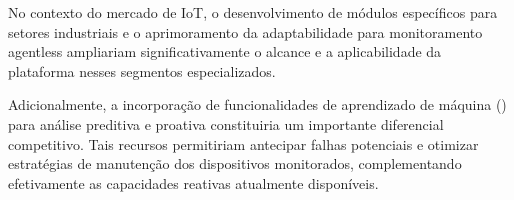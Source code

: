 No contexto do mercado de IoT, o desenvolvimento de módulos específicos para setores industriais e o aprimoramento da adaptabilidade para monitoramento agentless ampliariam significativamente o alcance e a aplicabilidade da plataforma nesses segmentos especializados.

Adicionalmente, a incorporação de funcionalidades de aprendizado de máquina () para análise preditiva e proativa constituiria um importante diferencial competitivo. Tais recursos permitiriam antecipar falhas potenciais e otimizar estratégias de manutenção dos dispositivos monitorados, complementando efetivamente as capacidades reativas atualmente disponíveis.

